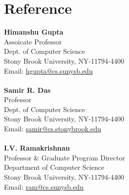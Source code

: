 \documentclass[]{friggeri-cv} %
\begin{document}
\section{Reference}
	  \textbf{Himanshu Gupta}\\
	  Assoicate Professor\\
	  Dept. of Computer Science\\
	  Stony Brook University, NY-11794-4400\\
	  Email: \href{hgupta@cs.sunysb.edu}{hgupta@cs.sunysb.edu} \\ \\ 
	  \textbf{Samir R. Das}\\
	  Professor\\
	  Dept. of Computer Science\\
	  Stony Brook University, NY-11794-4400\\
	  Email: \href{samir@cs.stonybrook.edu}{samir@cs.stonybrook.edu} \\ \\
	  \textbf{I.V. Ramakrishnan}\\
	  Professor \& Graduate Program Director\\
	  Department of Computer Science\\
	  Stony Brook University, NY-11794-4400 \\
	  Email: \href{mailto:ram@cs.sunysb.edu}{ram@cs.sunysb.edu}
\end{document}
